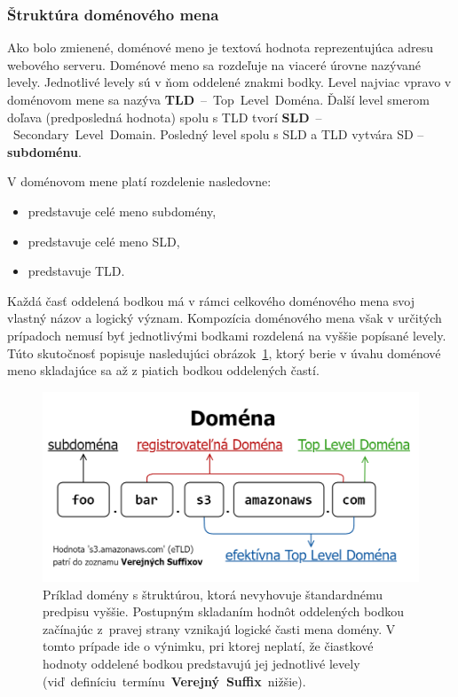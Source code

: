 \subsubsection{Štruktúra doménového mena}

Ako bolo zmienené, doménové meno je textová hodnota reprezentujúca adresu webového serveru.
Doménové meno sa rozdeľuje na viaceré úrovne nazývané levely. 
Jednotlivé levely sú v ňom oddelené znakmi bodky. 
Level najviac vpravo v doménovom mene sa nazýva \mbox{\textbf{TLD} -- Top Level Doména}. 
Ďalší level smerom doľava (predposledná hodnota) spolu s TLD tvorí \mbox{\textbf{SLD} -- Secondary Level Domain}.
Posledný level spolu s SLD a TLD vytvára SD -- \textbf{subdoménu}.

V doménovom mene  platí rozdelenie nasledovne: 
\begin{itemize}
    \item {} predstavuje celé meno subdomény,
    \item {} predstavuje celé meno SLD,
    \item {} predstavuje TLD.
\end{itemize}

Každá časť oddelená bodkou má v rámci celkového doménového mena svoj vlastný názov a logický význam.
Kompozícia doménového mena však v určitých prípadoch nemusí byť jednotlivými bodkami rozdelená na vyššie popísané levely. 
Túto skutočnosť popisuje nasledujúci \mbox{obrázok \ref{fig:domain-name-structure}}, \mbox{ktorý} berie v úvahu doménové meno skladajúce sa až z piatich bodkou oddelených častí.

\begin{figure}[htb]
\begin{center}
 \includegraphics[scale=0.45]{obrazky-figures/domain_name_structure.png}
 \caption{\centering Príklad domény s štruktúrou, ktorá nevyhovuje štandardnému predpisu vyššie. 
 Postupným skladaním hodnôt oddelených bodkou začínajúc \mbox{z pravej} strany vznikajú logické časti mena domény. 
 V tomto prípade ide o výnimku, pri ktorej neplatí, že čiastkové hodnoty oddelené bodkou predstavujú jej jednotlivé levely 
 \mbox{(viď definíciu termínu \textbf{Verejný Suffix} nižšie).}}
 \label{fig:domain-name-structure}
\end{center}
\end{figure}


